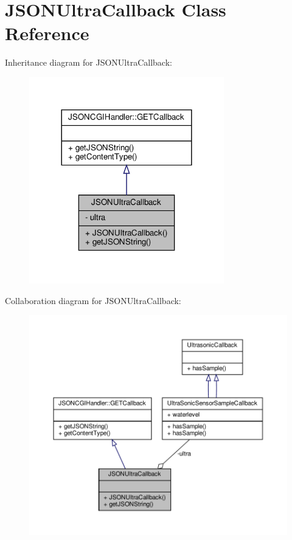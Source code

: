 \hypertarget{classJSONUltraCallback}{}\section{J\+S\+O\+N\+Ultra\+Callback Class Reference}
\label{classJSONUltraCallback}


Inheritance diagram for J\+S\+O\+N\+Ultra\+Callback\+:
\nopagebreak
\begin{figure}[H]
\begin{center}
\leavevmode
\includegraphics[width=240pt]{classJSONUltraCallback__inherit__graph}
\end{center}
\end{figure}


Collaboration diagram for J\+S\+O\+N\+Ultra\+Callback\+:
\nopagebreak
\begin{figure}[H]
\begin{center}
\leavevmode
\includegraphics[width=350pt]{classJSONUltraCallback__coll__graph}
\end{center}
\end{figure}
